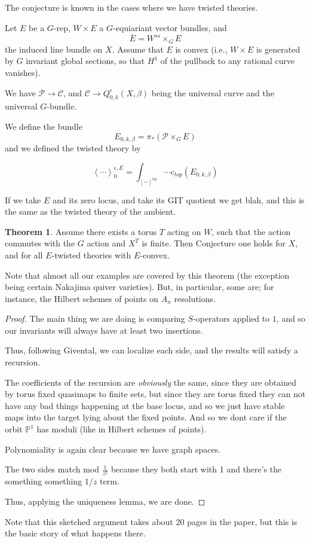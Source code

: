 \documentclass{amsart}
\theoremstyle{definition}
\newtheorem{theorem}[dummy]{Theorem}
\newcommand{\proj}{\mathbb{P}}
\newcommand{\one}{1}
\newcommand{\vir}{\text{vir}}
\begin{document}
The conjecture is known in the cases where we have twisted theories.

Let $E$ be a $G$-rep, $W\times E$ a $G$-equiariant vector bundles, and 
$$\overline{E}=W^{ss}\times_G E$$ the induced line bundle on $X$.  Assume that $E$ is convex (i.e., $W\times E$ is generated by $G$ invariant global sections, so that $H^1$ of the pullback to any rational curve vanishes).

We have $\mathcal{P}\to\mathcal{C}$, and $\mathcal{C}\to Q^\epsilon_{0,k}(X,\beta)$ being the universal curve and the universal $G$-bundle.

We define the bundle
$$E_{0,k,\beta}=\pi_*(\mathcal{P}\times_G  E)$$
and we defined the twisted theory by

$$\left\langle\cdots\right\rangle^{\epsilon, E}_0=\int_{[-]^\vir} \cdots c_{top}(E_{0,k,\beta})$$

If we take $E$ and its zero locus, and take its GIT quotient we get blah, and this is the same as the twisted theory of the ambient.


\begin{theorem}
Assume there exists a torus $T$ acting on $W$, such that the action commutes with the $G$ action and $X^T$ is finite.  Then Conjecture one holds for $X$, and for all $E$-twisted theories with $E$-convex.
\end{theorem}

Note that almost all our examples are covered by this theorem (the exception being certain Nakajima quiver varieties).  But, in particular, some are; for instance, the Hilbert schemes of points on $A_n$ resolutions.

\begin{proof}
The main thing we are doing is comparing $S$-operators applied to $\one$, and so our invariants will always have at least two insertions.

Thus, following Givental, we can localize each side, and the results will satisfy a recursion.

The coefficients of the recursion are \emph{obviously} the same, since they are obtained by torus fixed quasimaps to finite sets, but since they are torus fixed they can not have any bad things happening at the base locus, and so we just have stable maps into the target lying about the fixed points.  And so we dont care if the orbit $\proj^1$ has moduli (like in Hilbert schemes of points).

Polynomiality is again clear because we have graph spaces.

The two sides match mod $\frac{1}{z^2}$ because they both start with 1 and there's the something something $1/z$ term.

Thus, applying the uniqueness lemma, we are done.




\end{proof}
Note that this sketched argument takes about 20 pages in the paper, but this is the basic story of what happens there.
\end{document}
